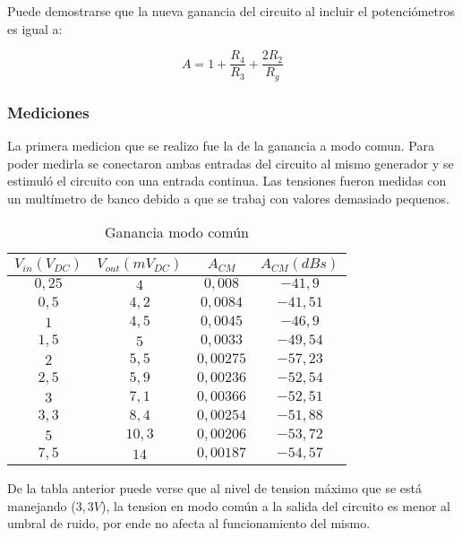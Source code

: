Puede demostrarse que la nueva ganancia del circuito al incluir el potenciómetros es igual a:


\begin{equation}
\boxed{A = 1 + \frac{R_4}{R_3} + \frac{2R_2}{R_g}}
\end{equation}



\subsubsection{Mediciones}
La primera medicion que se realizo fue la de la ganancia a modo comun. Para poder medirla se conectaron ambas entradas del circuito al mismo generador y se estimul\'o el circuito con una entrada continua. Las tensiones fueron medidas con un mult\'imetro de banco debido a que se trabaj con valores demasiado pequenos.


\begin{table}[H]
\centering
\begin{tabular}{cccc}\hline
$V_{in}(V_{DC})$ & $V_{out}(mV_{DC})$ & $A_{CM}$ & $A_{CM} (dBs)$ \\
\hline
$0,25$ & $4$ & $0,008$ & $-41,9$ \\
$0,5$   & $4,2$  & $0,0084$ & $-41,51$ \\
$1$  & $4,5$ & $0,0045$ & $-46,9$\\
$1,5$  & $5$ & $0,0033$ & $-49,54$\\
$2$  & $5,5$ & $0,00275$ & $-57,23$\\
$2,5$  & $5,9$ & $0,00236$ & $-52,54$\\
$3$  & $7,1$ & $0,00366$ & $-52,51$\\
$3,3$  & $8,4$ & $0,00254$ & $-51,88$\\
$5$  & $10,3$ & $0,00206$ & $-53,72$\\
$7,5$  & $14$ & $0,00187$ & $-54,57$\\ \hline
\end{tabular}
\caption{Ganancia modo com\'un}
\label{table:ganancia_comun}
\end{table}


De la tabla anterior puede verse que al nivel de tension m\'aximo que se est\'a manejando ($3,3V$), la tension en modo com\'un a la salida del circuito es menor al umbral de ruido, por ende no afecta al funcionamiento del mismo. 


